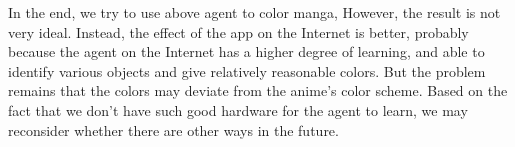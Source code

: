 \documentclass[10pt,twocolumn,letterpaper]{article}
\begin{document}
In the end, we try to use above agent to color manga, However, the result is not very ideal. Instead, the effect of the app on the Internet is better, probably because the agent on the Internet has a higher degree of learning, and able to identify various objects and give relatively reasonable colors. But the problem remains that the colors may deviate from the anime's color scheme. Based on the fact that we don't have such good hardware for the agent to learn, we may reconsider whether there are other ways in the future.


{\small


}
\end{document}
